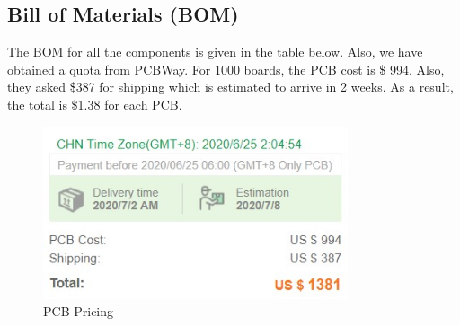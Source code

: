 \subsection{Bill of Materials (BOM)}
The BOM for all the components is given in the table below. Also, we have obtained a quota from PCBWay. For 1000 boards, the PCB cost is \$ 994. Also, they asked \$387 for shipping which is estimated to arrive in 2 weeks. As a result, the total is \$1.38 for each PCB.
\begin{figure}[H]
\begin{center}
\includegraphics[width=0.8\textwidth]{figures/pcbprice.jpg}
\caption{PCB Pricing}
\label{fig:pcbprice}
\end{center}
\end{figure}
